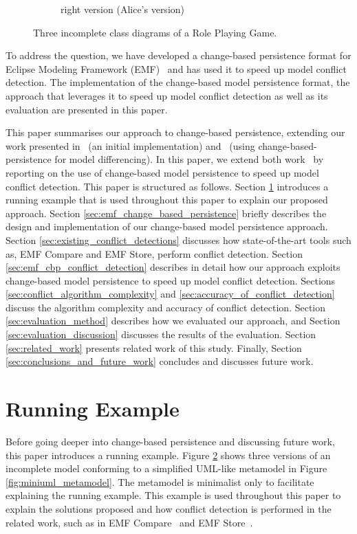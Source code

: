 \begin{figure}[]
\begin{subfigure}[t]{0.31\linewidth}
\caption{right version (Alice's version)}
\label{fig:class_diagram_right}
\end{subfigure}
\caption{Three incomplete class diagrams of a Role Playing Game.}
\label{fig:class_diagram_rpg}
\end{figure}

To address the question, we have developed a change-based persistence format for Eclipse Modeling Framework (EMF)~\cite{eclipse2019emf} and has used it to speed up model conflict detection. The implementation of the change-based model persistence format, the approach that leverages it to speed up model conflict detection as well as its evaluation are presented in this paper. 

This paper summarises our approach to change-based persistence, extending our work presented in~\cite{DBLP:conf/models/YohannisKP17} (an initial implementation) and~\cite{yohannis2019efficient} (using change-based-persistence for model differencing). In this paper, we extend both work~\cite{DBLP:conf/models/YohannisKP17,yohannis2019efficient} by reporting on the use of change-based model persistence to speed up model conflict detection. This paper is structured as follows. Section \ref{sec:running_example} introduces a running example that is used throughout this paper to explain our proposed approach. Section \ref{sec:emf_change_based_persistence} briefly describes the design and implementation of our change-based model persistence approach.  
Section \ref{sec:existing_conflict_detections} discusses how state-of-the-art tools such as, EMF Compare and EMF Store, perform conflict detection. 
Section \ref{sec:emf_cbp_conflict_detection} describes in detail how our approach exploits change-based model persistence to speed up model conflict detection. Sections \ref{sec:conflict_algorithm_complexity} and \ref{sec:accuracy_of_conflict_detection} discuss the algorithm complexity and accuracy of conflict detection. 
Section \ref{sec:evaluation_method} describes how we evaluated our approach, and Section \ref{sec:evaluation_discussion} discusses the results of the evaluation. Section \ref{sec:related_work} presents related work of this study. Finally, Section \ref{sec:conclusions_and_future_work} concludes and discusses future work.

\section{Running Example}
\label{sec:running_example}

Before going deeper into change-based persistence and discussing future work, this paper introduces a running example. Figure \ref{fig:class_diagram_rpg} shows three versions of an incomplete model conforming to a simplified UML-like metamodel in Figure \ref{fig:miniuml_metamodel}. The metamodel is minimalist only to facilitate explaining the running example. This example is used throughout this paper to explain the solutions proposed and how conflict detection is performed in the related work, such as in EMF Compare~\cite{emfcompare2018developer} and EMF Store~\cite{emfstore2019what}. 

